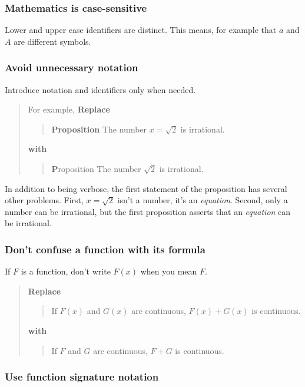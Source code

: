 \documentclass[12pt]{article}
\newcounter{ex}\setcounter{ex}{0}
\newcounter{id}\setcounter{id}{0}
\newcounter{se}\setcounter{se}{0}
\begin{document}
 \subsubsection{ Mathematics is case-sensitive}

Lower and upper case identifiers are distinct.  This means, for
example that \(a\) and \(A\) are different symbols.

 \subsubsection{  Avoid unnecessary notation}

Introduce notation and identifiers only when needed. 
\begin{quote}
For example, \textbf{Replace}
\begin{quote}
 \textbf {Proposition} The number \(x = \sqrt{2}\) is irrational.
\end{quote}
\textbf{with}
\begin{quote}
{ \textbf Proposition} The number \(\sqrt{2}\) is irrational.
\end{quote}
\end{quote}
In addition to being verbose, the first statement of the 
proposition has several other problems. First, \(x = \sqrt{2}\) isn't 
a number, it's an  {\em equation}. Second, only a number can be 
irrational, but the first proposition asserts that an {\em equation\/}
can be irrational. 

 \subsubsection{  Don't confuse a function with its formula}

If \(F\) is a function, don't write \(F(x)\) when you mean \(F\).

\begin{quote}
\textbf{\textbf{Replace}}
\begin{quote}
If \(F(x) \) and \(G(x)\) are continuous, \(F(x) + G(x)\) is 
continuous.
\end{quote}
\textbf{with}
\begin{quote}
If \(F\) and \(G\) are continuous, \(F + G\) is 
continuous.
\end{quote}
\end{quote}

 \subsubsection{  Use function signature notation}
\end{document}
